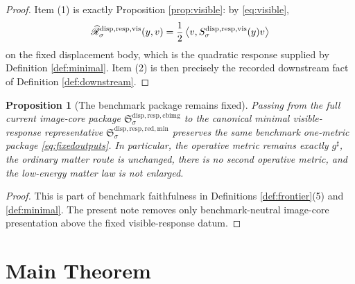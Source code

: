\documentclass[11pt]{article}
\newcommand{\CompletedMetric}{g^{\sharp}}
\newcommand{\CurrentBodyImageCore}{\mathfrak S^{\mathrm{disp,resp,cbimg}}}
\newcommand{\CoreForcedBodyResponse}[1]{\widehat{\mathscr R}_{#1}^{\mathrm{disp,resp,vis}}}
\newcommand{\VisibleResponseOperator}[1]{S_{#1}^{\mathrm{disp,resp,vis}}}
\newcommand{\MinimalReducedStructure}{\mathfrak S^{\mathrm{disp,resp,red,min}}}
\newtheorem{proposition}{Proposition}
\begin{document}
\begin{proof}
Item (1) is exactly Proposition \ref{prop:visible}: by \eqref{eq:visible},
\[
\CoreForcedBodyResponse{\sigma}(y,v)
=
\frac{1}{2}
\ev{v,\VisibleResponseOperator{\sigma}(y)v}
\]
on the fixed displacement body, which is the quadratic response supplied by Definition \ref{def:minimal}. Item (2) is then precisely the recorded downstream fact of Definition \ref{def:downstream}.
\end{proof}

\begin{proposition}[The benchmark package remains fixed]
\label{prop:benchmark}
Passing from the full current image-core package \(\CurrentBodyImageCore_{\sigma}\) to the canonical minimal visible-response representative \(\MinimalReducedStructure_{\sigma}\) preserves the same benchmark one-metric package \eqref{eq:fixedoutputs}. In particular, the operative metric remains exactly \(\CompletedMetric\), the ordinary matter route is unchanged, there is no second operative metric, and the low-energy matter law is not enlarged.
\end{proposition}

\begin{proof}
This is part of benchmark faithfulness in Definitions \ref{def:frontier}(5) and \ref{def:minimal}. The present note removes only benchmark-neutral image-core presentation above the fixed visible-response datum.
\end{proof}

\section{Main Theorem}
\end{document}
